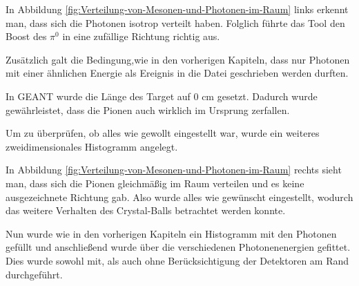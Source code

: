 \documentclass[a4paper,11pt,oneside,final,german,openbib,pdftex]{scrbook}
\begin{document}
{In Abbildung \ref{fig:Verteilung-von-Mesonen-und-Photonen-im-Raum} links erkennt man, dass sich die Photonen isotrop verteilt haben. Folglich f\"uhrte das Tool den Boost des $\pi^0$ in eine zuf\"allige Richtung richtig aus.

Zus\"atzlich galt die Bedingung,wie in den vorherigen Kapiteln, dass nur Photonen mit einer ähnlichen Energie als Ereignis in die Datei geschrieben werden durften.

In GEANT wurde die Länge des Target auf 0 cm gesetzt. Dadurch wurde gewährleistet, dass die Pionen auch wirklich im Ursprung zerfallen.




Um zu überprüfen, ob alles wie gewollt eingestellt war, wurde ein weiteres zweidimensionales Histogramm angelegt.



In Abbildung \ref{fig:Verteilung-von-Mesonen-und-Photonen-im-Raum} rechts sieht man, dass sich die Pionen gleichm\"a{\ss}ig im Raum verteilen und es keine ausgezeichnete Richtung gab. Also wurde alles wie gew\"unscht eingestellt, wodurch das weitere Verhalten des Crystal-Balls betrachtet werden konnte.

Nun wurde wie in den vorherigen Kapiteln ein Histogramm mit den Photonen gefüllt und anschließend wurde über die verschiedenen Photonenenergien gefittet. Dies wurde sowohl mit, als auch ohne Berücksichtigung der Detektoren am Rand durchgeführt.

}
\end{document}
